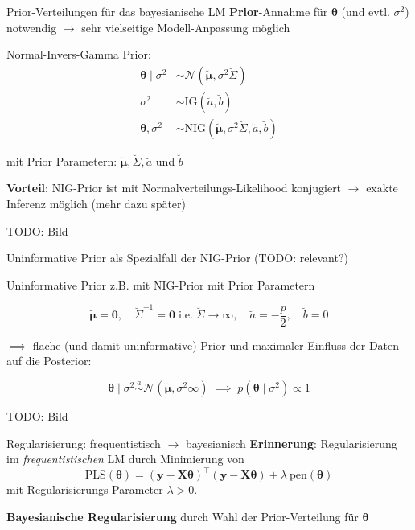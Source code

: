\documentclass[
  ignorenonframetext,
  aspectratio=169,
]{beamer}
\newcommand{\bnull}{\bm{0}}
\newcommand{\by}{\bm{y}}
\newcommand{\bX}{\bm{X}}
\newcommand{\Ncal}{\mathcal{N}}
\newcommand{\ssd}{\sigma^2}
\newcommand{\btheta}{\bm{\theta}}
\newcommand{\mupri}{\breve{\bm{\mu}}}
\newcommand{\Sdpri}{\breve{\Sigma}}
\newcommand{\Sdipri}{\breve{\Sigma}^{-1}}
\newcommand{\apri}{\breve{a}}
\newcommand{\bpri}{\breve{b}}
\newcommand{\IG}{\text{IG}}
\begin{document}
\begin{frame}{Prior-Verteilungen für das bayesianische LM}
\protect{}\label{prior-verteilungen-fuxfcr-das-bayesianische-lm}
\textbf{Prior}-Annahme für \(\btheta\) (und evtl. \(\ssd\)) notwendig
\(\to\) sehr vielseitige Modell-Anpassung möglich

\begin{block}{Normal-Invers-Gamma Prior:}
\protect{}\label{normal-invers-gamma-prior}
\[
\begin{aligned}
  \btheta \mid \ssd &\sim  \Ncal(\mupri, \ssd \Sdpri) \\
  \ssd &\sim \IG(\apri, \bpri) \\
  \btheta, \ssd &\sim \text{NIG}(\mupri, \ssd \Sdpri, \apri, \bpri)
\end{aligned}
\]

mit Prior Parametern: \(\mupri, \Sdpri, \apri\) und \(\bpri\)
\end{block}

\textbf{Vorteil}: NIG-Prior ist mit Normalverteilungs-Likelihood
konjugiert \(\to\) exakte Inferenz möglich (mehr dazu später)

TODO: Bild
\end{frame}

\begin{frame}{Uninformative Prior als Spezialfall der NIG-Prior}
\protect{}\label{uninformative-prior-als-spezialfall-der-nig-prior}
(TODO: relevant?)

\begin{block}{Uninformative Prior}
\protect{}\label{uninformative-prior}
z.B. mit NIG-Prior mit Prior Parametern

\[
\mupri = \bnull, \quad \Sdipri = \bnull \; \text{i.e.}\; \Sdpri \to \infty, \quad \apri = - \frac{p}{2}, \quad \bpri = 0
\]

\(\implies\) flache (und damit uninformative) Prior und maximaler
Einfluss der Daten auf die Posterior:

\[
\btheta \mid \ssd \overset{a}{\sim}  \Ncal(\mupri, \ssd \infty) \; \implies \; p(\btheta\mid \ssd) \propto 1
\]
\end{block}

TODO: Bild
\end{frame}

\begin{frame}{Regularisierung: frequentistisch \(\to\) bayesianisch}
\protect{}\label{regularisierung-frequentistisch-to-bayesianisch}
\textbf{Erinnerung}: Regularisierung im \emph{frequentistischen} LM
durch Minimierung von
\[\text{PLS}(\btheta) = (\by - \bX \btheta)^\top (\by - \bX \btheta) + \lambda \ \text{pen}(\btheta)\]
mit Regularisierungs-Parameter \(\lambda > 0\).

\textbf{Bayesianische Regularisierung} durch Wahl der Prior-Verteilung
für \(\btheta\)
\end{frame}
\end{document}
